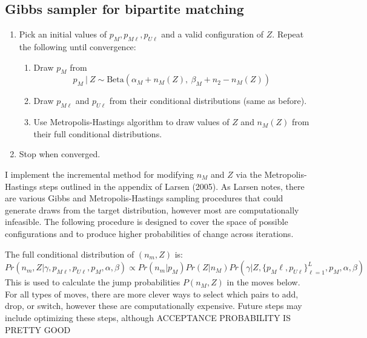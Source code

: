 \documentclass[11pt,reqno]{amsart}
\begin{document}
\subsection{Gibbs sampler for bipartite matching \citep{larsen_2005}}
\label{app:gibbsB}
\begin{enumerate} 
\item Pick an initial values of $p_M, p_{M\ell}, p_{U\ell}$ and a valid configuration of $Z$.  Repeat the following until convergence:
\begin{enumerate} 
\item Draw $p_M$ from $$ p_M\ |\ Z \sim \text{Beta}(\alpha_M + n_{M}(Z),\ \beta_M + n_{2} - n_{M}(Z)) $$ 

\item  Draw $p_{M\ell}$ and $p_{U\ell}$ from their conditional distributions (same as before).

\item Use Metropolis-Hastings algorithm to draw values of $Z$ and $n_{M}(Z)$ from their full conditional distributions. 

\end{enumerate}

\item Stop when converged. 
\end{enumerate}



I implement the incremental method for modifying $n_M$ and $Z$ via the Metropolis-Hastings steps outlined in the appendix of Larsen (2005).  As Larsen notes, there are various Gibbs and Metropolis-Hastings sampling procedures that could generate draws from the target distribution, however most are computationally infeasible.  The following procedure is designed to cover the space of possible configurations and to produce higher probabilities of change across iterations.  

The full conditional distribution of $(n_m, Z)$ is:
\begin{equation} 
Pr\left(n_m, Z | \gamma, p_{M\ell}, p_{U\ell}, p_M, \alpha, \beta \right) \propto Pr(n_m | p_M) Pr(Z | n_M) Pr\left(\gamma | Z,  \{p_M{\ell}, p_{U\ell}\}_{\ell=1}^L, p_M, \alpha, \beta \right) \label{nmZ} \end{equation}
This is used to calculate the jump probabilities $P(n_M, Z) $ in the moves below.  For all types of moves, there are more clever ways to select which pairs to add, drop, or switch, however these are computationally expensive.  Future steps may include optimizing these steps, although ACCEPTANCE PROBABILITY IS PRETTY GOOD %
\end{document}
